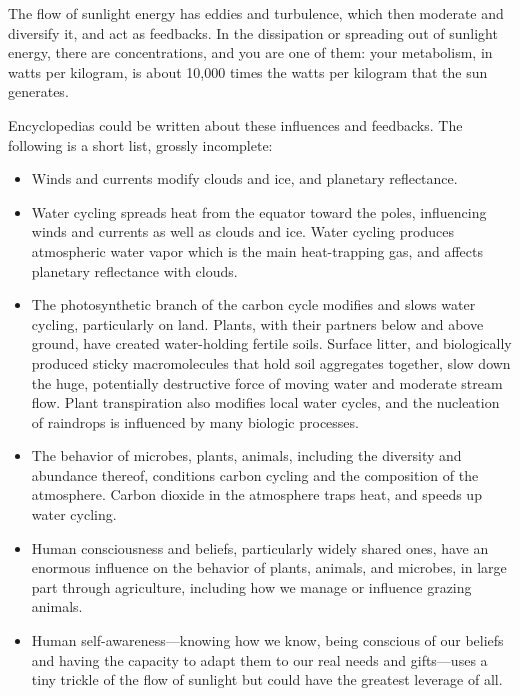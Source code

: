 \documentclass[11pt,letterpaper,twoside,onecolumn]{memoir}
\begin{document}
The flow of sunlight energy has eddies and turbulence, which then moderate and diversify it, and act as feedbacks. In the dissipation or spreading out of sunlight energy, there are concentrations, and you are one of them: your metabolism, in watts per kilogram, is about 10,000 times the watts per kilogram that the sun generates. 

Encyclopedias could be written about these influences and feedbacks. The following is a short list, grossly incomplete:

\begin{itemize}

\item[] Winds and currents modify clouds and ice, and planetary reflectance.

\item[] Water cycling spreads heat from the equator toward the poles, influencing winds and currents as well as clouds and ice. Water cycling produces atmospheric water vapor which is the main heat-trapping gas, and affects planetary reflectance with clouds.

\item[] The photosynthetic branch of the carbon cycle modifies and slows water cycling, particularly on land. Plants, with their partners below and above ground, have created water-holding fertile soils. Surface litter, and biologically produced sticky macromolecules that hold soil aggregates together, slow down the huge, potentially destructive force of moving water and moderate stream flow. Plant transpiration also modifies local water cycles, and the nucleation of raindrops is influenced by many biologic processes.\label{biotic pump}

\item[] The behavior of microbes, plants, animals, including the diversity and abundance thereof, conditions carbon cycling and the composition of the atmosphere. Carbon dioxide in the atmosphere traps heat, and speeds up water cycling.

\item[] Human consciousness and beliefs, particularly widely shared ones, have an enormous influence on the behavior of plants, animals, and microbes, in large part through agriculture, including how we manage or influence grazing animals.

\item[] Human self-awareness---knowing how we know, being conscious of our beliefs and having the capacity to adapt them to our real needs and gifts---uses a tiny trickle of the flow of sunlight but could have the greatest leverage of all.
\end{itemize}
\end{document}
